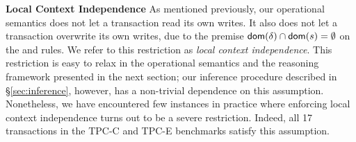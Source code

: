 \textbf{Local Context Independence} As mentioned previously, our
operational semantics does not let a transaction read its own writes.
It also does not let a transaction overwrite its own writes, due to
the premise $\textsf{dom}(\delta)\cap\textsf{dom}(s) = \emptyset$ on the
 and  rules. We refer to this
restriction as \emph{local context independence}.  This restriction is
easy to relax in the operational semantics and the reasoning framework
presented in the next section; our inference procedure described in
\S\ref{sec:inference}, however, has a non-trivial dependence on
this assumption. Nonetheless, we have encountered few instances in
practice where enforcing local context independence turns out to be a
severe restriction. Indeed, all 17 transactions in the TPC-C and TPC-E
benchmarks satisfy this assumption.



